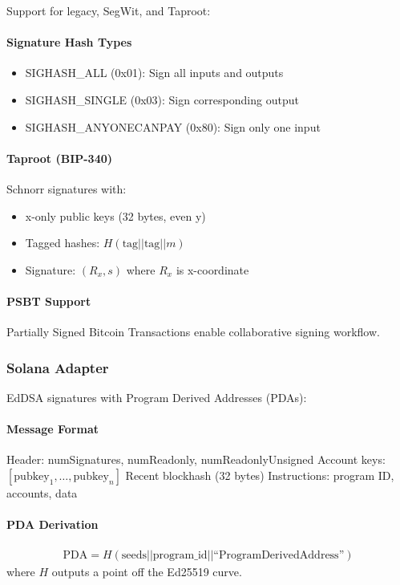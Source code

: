 \documentclass[11pt,twocolumn]{article}
\begin{document}
Support for legacy, SegWit, and Taproot:

\paragraph{Signature Hash Types}
\begin{itemize}
\item SIGHASH\_ALL (0x01): Sign all inputs and outputs
\item SIGHASH\_SINGLE (0x03): Sign corresponding output
\item SIGHASH\_ANYONECANPAY (0x80): Sign only one input
\end{itemize}

\paragraph{Taproot (BIP-340)} Schnorr signatures with:
\begin{itemize}
\item x-only public keys (32 bytes, even y)
\item Tagged hashes: $H(\text{tag} || \text{tag} || m)$
\item Signature: $(R_x, s)$ where $R_x$ is x-coordinate
\end{itemize}

\paragraph{PSBT Support} Partially Signed Bitcoin Transactions enable collaborative signing workflow.

\subsubsection{Solana Adapter}

EdDSA signatures with Program Derived Addresses (PDAs):

\paragraph{Message Format}
\begin{algorithmic}[1]
\State Header: numSignatures, numReadonly, numReadonlyUnsigned
\State Account keys: $[\text{pubkey}_1, \ldots, \text{pubkey}_n]$
\State Recent blockhash (32 bytes)
\State Instructions: program ID, accounts, data
\end{algorithmic}

\paragraph{PDA Derivation}
\begin{align*}
\text{PDA} = H(\text{seeds} || \text{program\_id} || \text{``ProgramDerivedAddress''})
\end{align*}
where $H$ outputs a point off the Ed25519 curve.
\end{document}
